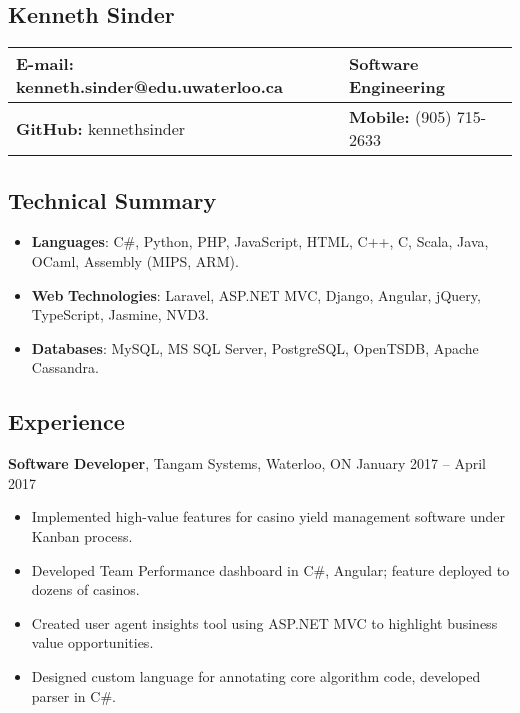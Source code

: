 \documentclass[]{article}
\date{}
\begin{document}
\begin{center}
\section{Kenneth Sinder}

\begin{tabularx}{\hsize}{XX}
\toprule
\textbf{E-mail}: kenneth.sinder@edu.uwaterloo.ca & \textbf{Software
Engineering}\tabularnewline
\midrule
\endhead
\textbf{GitHub:} kennethsinder & \textbf{Mobile:} (905)
715-2633\tabularnewline
\bottomrule
\end{tabularx}

\end{center}

\subsection{Technical Summary}

\begin{itemize}
\item
  \textbf{Languages}: C\#, Python, PHP, JavaScript, HTML, C++, C, Scala,
  Java, OCaml, Assembly (MIPS, ARM).
\item
  \textbf{Web} \textbf{Technologies}: Laravel, ASP.NET MVC, Django,
  Angular, jQuery, TypeScript, Jasmine, NVD3.
\item
  \textbf{Databases}: MySQL, MS SQL Server, PostgreSQL, OpenTSDB, Apache
  Cassandra.
\end{itemize}

\subsection{Experience}

\textbf{Software Developer}, Tangam Systems, Waterloo, ON January 2017
-- April 2017

\begin{itemize}
\item
  Implemented high-value features for casino yield management software
  under Kanban process.
\item
  Developed Team Performance dashboard in C\#, Angular; feature deployed
  to dozens of casinos.
\item
  Created user agent insights tool using ASP.NET MVC to highlight
  business value opportunities.
\item
  Designed custom language for annotating core algorithm code, developed
  parser in C\#.
\end{itemize}
\end{document}
